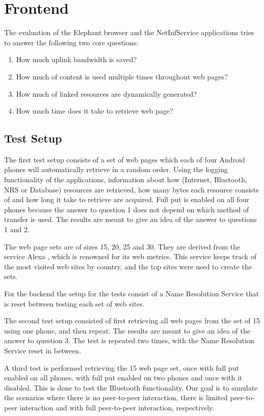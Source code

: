 \section{Frontend}

The evaluation of the Elephant browser and the NetInfService applications tries to answer the following two core questions:

\begin{enumerate}
\item How much uplink bandwidth is saved?
\item How much of content is used multiple times throughout web pages?
\item How much of linked resources are dynamically generated?
\item How much time does it take to retrieve web page?
\end{enumerate}

\subsection{Test Setup}

The first test setup consists of a set of web pages which each of four Android phones will automatically retrieve in a random order. Using the logging functionality of the applications, information about how (Internet, Bluetooth, NRS or Database) resources are retrieved, how many bytes each resource consists of and how long it take to retrieve are acquired. Full put is enabled on all four phones because the answer to question 1 does not depend on which method of transfer is used. The results are meant to give an idea of the answer to questions 1 and 2.

The web page sets are of sizes 15, 20, 25 and 30. They are derived from the service Alexa \cite{alexa}, which is renowned for its web metrics. This service keeps track of the most visited web sites by country, and the top sites were used to create the sets.

For the backend the setup for the tests consist of a Name Resolution Service that is reset between testing each set of web sites.

The second test setup consisted of first retrieving all web pages from the set of 15 using one phone, and then repeat. The results are meant to give an idea of the answer to question 3. The test is repeated two times, with the Name Resolution Service reset in between. 

A third test is performed retrieving the 15 web page set, once with full put enabled on all phones, with full put enabled on two phones and once with it disabled. This is done to test the Bluetooth functionality. Our goal is to simulate the scenarios where there is no peer-to-peer interaction, there is limited peer-to-peer interaction and with full peer-to-peer interaction, respectively.

